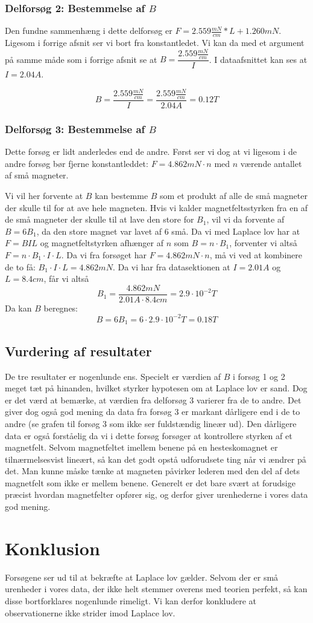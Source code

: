 \documentclass[10pt,a4paper]{article}
\theoremstyle{break}
\theoremstyle{nonumberplain}
\begin{document}
\subsubsection{Delforsøg 2: Bestemmelse af $B$}
Den fundne sammenhæng i dette delforsøg er $F = 2.559\frac{mN}{cm}*L + 1.260mN$.
Ligesom i forrige afsnit ser vi bort fra konstantledet.
Vi kan da med et argument på samme måde som i forrige afsnit se at $B=\dfrac{2.559\frac{mN}{cm}}{I}$. 
I dataafsnittet kan ses at $I=2.04A$.

$$B = \dfrac{2.559\frac{mN}{cm}}{I}  = \dfrac{2.559\frac{mN}{cm}}{2.04A} = 0.12T$$

\subsubsection{Delforsøg 3: Bestemmelse af $B$}
Dette forsøg er lidt anderledes end de andre.
Først ser vi dog at vi ligesom i de andre forsøg bør fjerne konstantleddet: $F = 4.862mN\cdot n$ med $n$ værende antallet af små magneter. 
 
Vi vil her forvente at $B$ kan bestemme $B$ som et produkt af alle de små magneter der skulle til for at ave hele magneten. 
Hvis vi kalder magnetfeltsstyrken fra en af de små magneter der skulle til at lave den store for $B_1$, vil vi da forvente af $B=6B_1$, da den store magnet var lavet af $6$ små.
Da vi med Laplace lov har at $F=BIL$ og magnetfeltstyrken afhænger af $n$ som $B=n\cdot B_1$, forventer vi altså $F=n\cdot B_1 \cdot I \cdot L$.
Da vi fra forsøget har $F=4.862mN\cdot n$, må vi ved at kombinere de to få: 
$B_1 \cdot I \cdot L = 4.862mN$.
Da vi har fra datasektionen at $I=2.01A$ og $L=8.4cm$, får vi altså 
$$B_1 = \dfrac{4.862mN}{2.01 A\cdot 8.4 cm}=2.9\cdot 10^{-2}T$$
Da kan $B$ beregnes:
$$B = 6 B_1 = 6\cdot 2.9\cdot 10^{-2}T=0.18T$$

\subsection{Vurdering af resultater}
De tre resultater er nogenlunde ens. 
Specielt er værdien af $B$ i forsøg 1 og 2 meget tæt på hinanden, hvilket styrker hypotesen om at Laplace lov er sand. 
Dog er det værd at bemærke, at værdien fra delforsøg 3 varierer fra de to andre.
Det giver dog også god mening da data fra forsøg 3 er markant dårligere end i de to andre (se grafen til forsøg 3 som ikke ser fuldstændig lineær ud). 
Den dårligere data er også forståelig da vi i dette forsøg forsøger at kontrollere styrken af et magnetfelt. 
Selvom magnetfeltet imellem benene på en hesteskomagnet er tilnærmelsesvist lineært, så kan det godt opstå udforudsete ting når vi ændrer på det. 
Man kunne måske tænke at magneten påvirker lederen med den del af dets magnetfelt som ikke er mellem benene. 
Generelt er det bare svært at forudsige præcist hvordan magnetfelter opfører sig, og derfor giver urenhederne i vores data god mening. 

\section{Konklusion}
Forsøgene ser ud til at bekræfte at Laplace lov gælder. 
Selvom der er små urenheder i vores data, der ikke helt stemmer overens med teorien perfekt, så kan disse bortforklares nogenlunde rimeligt. 
Vi kan derfor konkludere at observationerne ikke strider imod Laplace lov.
\end{document}
